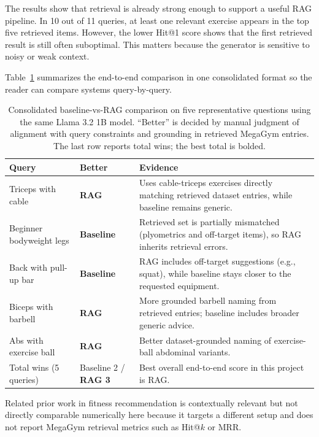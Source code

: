 \documentclass[fleqn,moreauthors,10pt]{ds_report}
\begin{document}
The results show that retrieval is already strong enough to support a useful RAG pipeline. In 10 out of 11 queries, at least one relevant exercise appears in the top five retrieved items. However, the lower Hit@1 score shows that the first retrieved result is still often suboptimal. This matters because the generator is sensitive to noisy or weak context.

Table~\ref{tab:e2e-comparison} summarizes the end-to-end comparison in one consolidated format so the reader can compare systems query-by-query.

\begin{table}[h]
\centering
\caption{Consolidated baseline-vs-RAG comparison on five representative questions using the same Llama 3.2 1B model. ``Better'' is decided by manual judgment of alignment with query constraints and grounding in retrieved MegaGym entries. The last row reports total wins; the best total is bolded.}
\label{tab:e2e-comparison}
\small
\begin{tabularx}{\columnwidth}{@{}>{\raggedright\arraybackslash}p{} >{\raggedright\arraybackslash}p{} >{\raggedright\arraybackslash}X@{}}
\toprule
Query & Better & Evidence \\
\midrule
Triceps with cable & \textbf{RAG} & Uses cable-triceps exercises directly matching retrieved dataset entries, while baseline remains generic. \\
Beginner bodyweight legs & \textbf{Baseline} & Retrieved set is partially mismatched (plyometrics and off-target items), so RAG inherits retrieval errors. \\
Back with pull-up bar & \textbf{Baseline} & RAG includes off-target suggestions (e.g., squat), while baseline stays closer to the requested equipment. \\
Biceps with barbell & \textbf{RAG} & More grounded barbell naming from retrieved entries; baseline includes broader generic advice. \\
Abs with exercise ball & \textbf{RAG} & Better dataset-grounded naming of exercise-ball abdominal variants. \\
\midrule
Total wins (5 queries) & Baseline 2 / \textbf{RAG 3} & Best overall end-to-end score in this project is RAG. \\
\bottomrule
\end{tabularx}
\end{table}

\noindent Related prior work in fitness recommendation \cite{Yang2023} is contextually relevant but not directly comparable numerically here because it targets a different setup and does not report MegaGym retrieval metrics such as Hit@$k$ or MRR.
\end{document}
